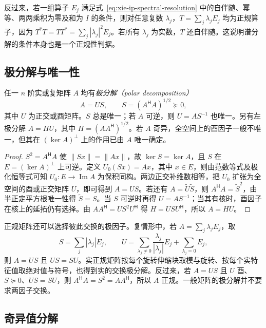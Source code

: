 反过来，若一组算子 $E_j$ 满足式~\eqref{eq:xie-ip-spectral-resolution} 中的自伴随、幂等、两两乘积为零及和为 $I$ 的条件，则对任意复数 $\lambda_j$，$T=\sum_j\lambda_jE_j$ 均为正规算子，因为 $T^*T=TT^*=\sum_j|\lambda_j|^2E_j$。若所有 $\lambda_j$ 为实数，$T$ 还自伴随。这说明谱分解的条件本身也是一个正规性判据。

\subsection{极分解与唯一性}

\begin{theorem}
\label{thm:xie-ip-polar}
任一 $n$ 阶实或复矩阵 $A$ 均有\emph{极分解（polar decomposition）}
\begin{equation}
\label{eq:xie-ip-polar}
A=US,\qquad S=(A^{\mathsf H}A)^{1/2}\succeq0,
\end{equation}
其中 $U$ 为正交或酉矩阵。$S$ 总是唯一；若 $A$ 可逆，则 $U=AS^{-1}$ 也唯一。另有左极分解 $A=HU$，其中 $H=(AA^{\mathsf H})^{1/2}$。若 $A$ 奇异，全空间上的酉因子一般不唯一，但其在 $(\ker A)^\perp$ 上的作用已由 $A$ 唯一确定。
\end{theorem}
\begin{proof}
$S^2=A^{\mathsf H}A$ 使 $\|Sx\|=\|Ax\|$，故 $\ker S=\ker A$，且 $S$ 在 $E=(\ker A)^\perp$ 上可逆。定义 $U_0(Sx)=Ax$，其中 $x\in E$，则由范数等式及极化恒等式可知 $U_0:E\to\operatorname{Im}A$ 为保积同构。两边正交补维数相等，把 $U_0$ 扩张为全空间的酉或正交矩阵 $U$，即可得到 $A=US$。若还有 $A=\widetilde U\widetilde S$，则 $A^{\mathsf H}A=\widetilde S^2$，由半正定平方根唯一性得 $\widetilde S=S$。当 $S$ 可逆时再得 $U=AS^{-1}$；当其有核时，酉因子在核上的延拓仍有选择。由 $AA^{\mathsf H}=US^2U^{\mathsf H}$ 得 $H=USU^{\mathsf H}$，所以 $A=HU$。
\end{proof}

正规矩阵还可以选择彼此交换的极因子。复情形中，若 $A=\sum_j\lambda_jE_j$，取
\[
S=\sum_j|\lambda_j|E_j,\qquad
U=\sum_{\lambda_j\ne0}\frac{\lambda_j}{|\lambda_j|}E_j
+\sum_{\lambda_j=0}E_j,
\]
则 $A=US$ 且 $US=SU$。实正规矩阵按每个旋转伸缩块取模与旋转、按每个实特征值取绝对值与符号，也得到实的交换极分解。反过来，若 $A=US$ 且 $U$ 酉、$S\succeq0$、$US=SU$，则 $A^{\mathsf H}A=S^2=AA^{\mathsf H}$，所以 $A$ 正规。一般矩阵的极分解并不要求两因子交换。

\subsection{奇异值分解}

